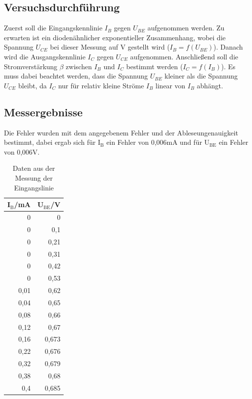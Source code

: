 \documentclass[12pt,a4paper]{article}
\begin{document}
\subsection{Versuchsdurchführung}
Zuerst soll die Eingangskennlinie  $I_B$ gegen $U_{BE}$ aufgenommen werden. Zu erwarten ist ein diodenähnlicher exponentieller Zusammenhang, wobei die Spannung $U_{CE}$  bei dieser Messung auf \unit[5]{V} gestellt wird ($I_B = f(U_{BE})$). Danach wird die Ausgangskennlinie $I_C$ gegen $U_{CE}$ aufgenommen.
Anschließend soll die Stromverstärkung $\beta$ zwischen $I_B$ und $I_C$ bestimmt werden ($I_C = f(I_B)$). Es muss dabei beachtet werden, dass die Spannung $U_{BE}$ kleiner als die Spannung $U_{CE}$ bleibt, da $I_C$ nur für relativ kleine Ströme $I_B$ linear von $I_B$ abhängt.
\subsection{Messergebnisse}

Die Fehler wurden mit dem angegebenem Fehler und der Ableseungenauigkeit bestimmt, dabei ergab sich für I$_\text{B}$ ein Fehler von 0,006mA und für U$_\text{BE}$ ein Fehler von 0,006V.

\begin{table}[H]
\caption{Daten aus der Messung der Eingangslinie}
\begin{center}
\begin{tabular}{|r|r|}
\hline
\multicolumn{1}{|l|}{I$_\text{B}$/mA} & \multicolumn{1}{l|}{U$_\text{BE}$/V} \\ \hline
0 & 0 \\ \hline
0 & 0,1 \\ \hline
0 & 0,21 \\ \hline
0 & 0,31 \\ \hline
0 & 0,42 \\ \hline
0 & 0,53 \\ \hline
0,01 & 0,62 \\ \hline
0,04 & 0,65 \\ \hline
0,08 & 0,66 \\ \hline
0,12 & 0,67 \\ \hline
0,16 & 0,673 \\ \hline
0,22 & 0,676 \\ \hline
0,32 & 0,679 \\ \hline
0,38 & 0,68 \\ \hline
0,4 & 0,685 \\ \hline
\end{tabular}
\end{center}
\label{tab:a_1_e}
\end{table}
\end{document}
